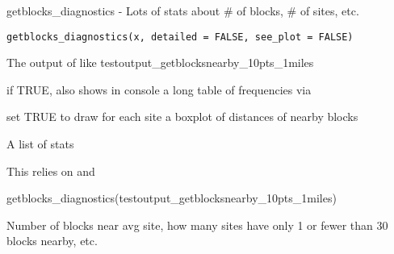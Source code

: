 \documentclass[a4paper]{book}
\begin{document}
%
\begin{Description}\relax
getblocks\_diagnostics - Lots of stats about \# of blocks, \# of sites, etc.
\end{Description}
%
\begin{Usage}
\begin{verbatim}
getblocks_diagnostics(x, detailed = FALSE, see_plot = FALSE)
\end{verbatim}
\end{Usage}
%
\begin{Arguments}
\begin{ldescription}
\item[\code{x}] The output of  like testoutput\_getblocksnearby\_10pts\_1miles

\item[\code{detailed}] if TRUE, also shows in console a long table of frequencies via 

\item[\code{see\_plot}] set TRUE to draw for each site a boxplot of distances of nearby blocks
\end{ldescription}
\end{Arguments}
%
\begin{Value}
A list of stats
\end{Value}
%
\begin{SeeAlso}\relax
This relies on   and 
\end{SeeAlso}
%
\begin{Examples}
\begin{ExampleCode}
 getblocks_diagnostics(testoutput_getblocksnearby_10pts_1miles)
\end{ExampleCode}
\end{Examples}
%
\begin{Description}\relax
Number of blocks near avg site, how many sites have only 1 or fewer than 30 blocks nearby, etc.
\end{Description}
\end{document}

